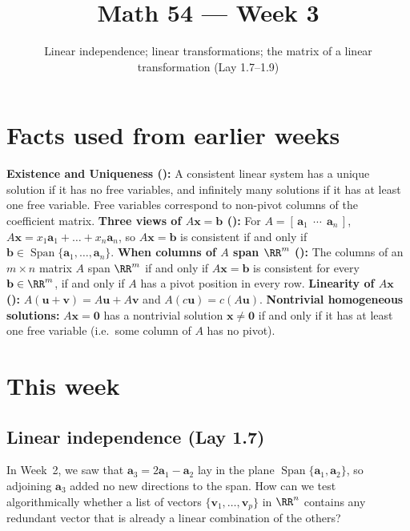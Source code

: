 \documentclass[10pt]{scrartcl}
\title{Math 54 --- Week 3}
\subtitle{Linear independence; linear transformations; the matrix of a linear transformation (Lay 1.7--1.9)}
\author{}\date{}\ihead{}
\newcommand{\vv}[1]{\mathbf{#1}}
\DeclareMathOperator{\spn}{Span}\DeclareMathOperator{\Col}{Col}\DeclareMathOperator{\range}{range}
\begin{document}
\maketitle

\section{Facts used from earlier weeks}
\begin{enumerate}[label=(W\arabic*),leftmargin=2.8em,itemsep=4pt]
  \ii {}\textbf{Existence and Uniqueness ():} A consistent linear system has a unique solution if it has no free variables, and infinitely many solutions if it has at least one free variable. Free variables correspond to non-pivot columns of the coefficient matrix.
  \ii {}\textbf{Three views of $A\vv x=\vv b$ ():} For $A=[\,\vv a_1\ \ \cdots\ \ \vv a_n\,]$, $A\vv x=x_1\vv a_1+\dots+x_n\vv a_n$, so $A\vv x=\vv b$ is consistent if and only if $\vv b\in\spn\{\vv a_1,\dots,\vv a_n\}$.
  \ii {}\textbf{When columns of $A$ span $\RR^m$ ():} The columns of an $m\times n$ matrix $A$ span $\RR^m$ if and only if $A\vv x=\vv b$ is consistent for every $\vv b\in\RR^m$, if and only if $A$ has a pivot position in every row.
  \ii {}\textbf{Linearity of $A\vv x$ ():} $A(\vv u+\vv v)=A\vv u+A\vv v$ and $A(c\vv u)=c(A\vv u)$.
  \ii {}\textbf{Nontrivial homogeneous solutions:} $A\vv x=\vv 0$ has a nontrivial solution $\vv x\ne\vv 0$ if and only if it has at least one free variable (i.e.\ some column of $A$ has no pivot).
\end{enumerate}

\section{This week}

\subsection{Linear independence (Lay 1.7)}

\begin{qbox}
  In Week~2, we saw that $\vv a_3=2\vv a_1-\vv a_2$ lay in the plane $\spn\{\vv a_1,\vv a_2\}$, so adjoining $\vv a_3$ added no new directions to the span. How can we test algorithmically whether a list of vectors $\{\vv v_1,\dots,\vv v_p\}$ in $\RR^n$ contains any redundant vector that is already a linear combination of the others?
\end{qbox}
\end{document}
